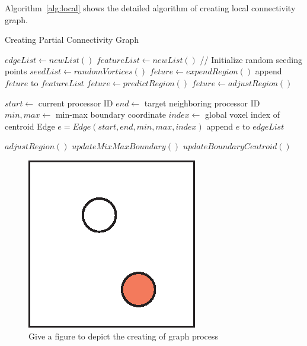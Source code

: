 \documentclass[10pt, conference, compsocconf]{IEEEtran}
\begin{document}
Algorithm~\ref{alg:local} shows the detailed algorithm of creating local connectivity graph.
\begin{algorithm}
\caption{Creating Partial Connectivity Graph}
\label{alg:local}
\begin{algorithmic}[1]
\STATE $edgeList \leftarrow new List()$
\STATE $featureList \leftarrow new List()$
	\STATE // Initialize random seeding points
	\STATE $seedList \leftarrow randomVortices()$
		\STATE $feture \leftarrow expendRegion()$
		\STATE append $feture$ to $featureList$
	\ENDFOR	
\ELSE
		\STATE $feture \leftarrow predictRegion()$
		\STATE $feture \leftarrow adjustRegion()$	
		
		\STATE $start \leftarrow$ current processor ID
		\STATE $end \leftarrow$ target neighboring processor ID
		\STATE $min,max \leftarrow$ min-max boundary coordinate
		\STATE $index \leftarrow$ global voxel index of centroid
		\STATE Edge $e = Edge(start, end, min, max, index)$
		\STATE append $e$ to $edgeList$
	\ENDFOR
\ENDIF
\end{algorithmic}
\begin{algorithmic} \STATE \end{algorithmic}	%
\begin{algorithmic}[1]
\STATE $adjustRegion()$
		\STATE $updateMixMaxBoundary()$
		\STATE $updateBoundaryCentroid()$
	\ENDIF
\end{algorithmic}
\end{algorithm}

\begin{figure}[ht]
\centering
\includegraphics[width=0.45\linewidth]{blank.png}
\caption{Give a figure to depict the creating of graph process}
\label{fig:todo}
\end{figure}
\end{document}
